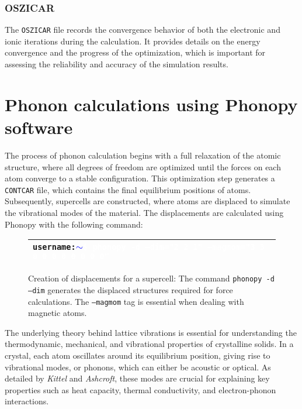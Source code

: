 \subsubsection{OSZICAR}
The \texttt{OSZICAR} file records the convergence behavior of both the electronic and ionic iterations during the calculation. It provides details on the energy convergence and the progress of the optimization, which is important for assessing the reliability and accuracy of the simulation results.

\section{Phonon calculations using Phonopy software}

The process of phonon calculation begins with a full relaxation of the atomic structure, where all degrees of freedom are optimized until the forces on each atom converge to a stable configuration. This optimization step generates a \texttt{CONTCAR} file, which contains the final equilibrium positions of atoms. Subsequently, supercells are constructed, where atoms are displaced to simulate the vibrational modes of the material. The displacements are calculated using Phonopy with the following command:

\begin{figure}[H]
	\begin{tabular}{>{\columncolor{black}}p{\linewidth}}
		\texttt{\textcolor{green!70!black}{username:\textcolor{blue}{$\sim$}}\textcolor{white}{\$} \textcolor{white}{phonopy -d --dim="2 2 1" --magmom="3 3 0 0 0 0 0 0 0 0"}} \\ \hline
	\end{tabular}
	\centering
	\caption{Creation of displacements for a supercell: The command \texttt{phonopy -d --dim} generates the displaced structures required for force calculations. The \texttt{--magmom} tag is essential when dealing with magnetic atoms.}
	\label{fig:fig3.4}
	\label{displacements}
\end{figure}

The underlying theory behind lattice vibrations is essential for understanding the thermodynamic, mechanical, and vibrational properties of crystalline solids. In a crystal, each atom oscillates around its equilibrium position, giving rise to vibrational modes, or phonons, which can either be acoustic or optical. As detailed by \textit{Kittel}\supercite{kittel2021} and \textit{Ashcroft}\supercite{ashcroft1976}, these modes are crucial for explaining key properties such as heat capacity, thermal conductivity, and electron-phonon interactions.

